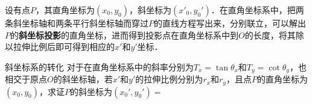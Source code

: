 设有点$P$，其直角坐标为$(x_0, y_0)$，斜坐标为$(x'_0, y_0')$．在直角坐标系中，把两条斜坐标轴和两条平行斜坐标轴而穿过$P$的直线方程写出来，分别联立，可以解出$P$的\textbf{斜坐标投影}的直角坐标，进而得到投影点在直角坐标系中到$O$的长度，将其除以拉伸比例后即可得到相应的$x'$和$y'$坐标．

\begin{example}{斜坐标系的转化}
对于在直角坐标系中的斜率分别为$T_x=\tan{\theta_x}$和$T_y=\cot{\theta_y}$，也相交于原点$O$的斜坐标轴，若$x'$和$y'$的拉伸比例分别为$r_x$和$r_y$，且点$P$的直角坐标为$(x_0, y_0)$，求证$P$的斜坐标为$(x_0', y_0')=$
\end{example}





